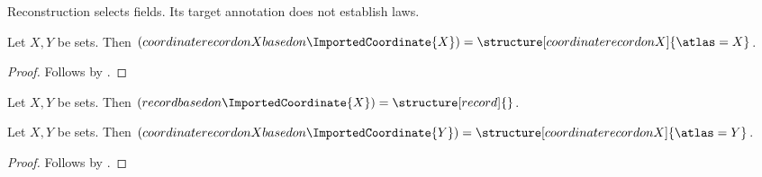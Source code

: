 

Reconstruction selects fields. Its target annotation does not establish laws.

\begin{proposition}\label{expression_original}
    Let $X,Y$ be sets.
    Then $(coordinate record on X based on \ImportedCoordinate{X})=
        \structure[coordinate record on X]{\atlas=X}$.
\end{proposition}
\begin{proof}
    Follows by .
\end{proof}

\begin{proposition}\label{expression_target}
    Let $X,Y$ be sets.
    Then $(record based on \ImportedCoordinate{X})=\structure[record]{}$.
\end{proposition}

\begin{proposition}\label{expression_base}
    Let $X,Y$ be sets.
    Then $(coordinate record on X based on \ImportedCoordinate{Y})=
        \structure[coordinate record on X]{\atlas=Y}$.
\end{proposition}
\begin{proof}
    Follows by .
\end{proof}
